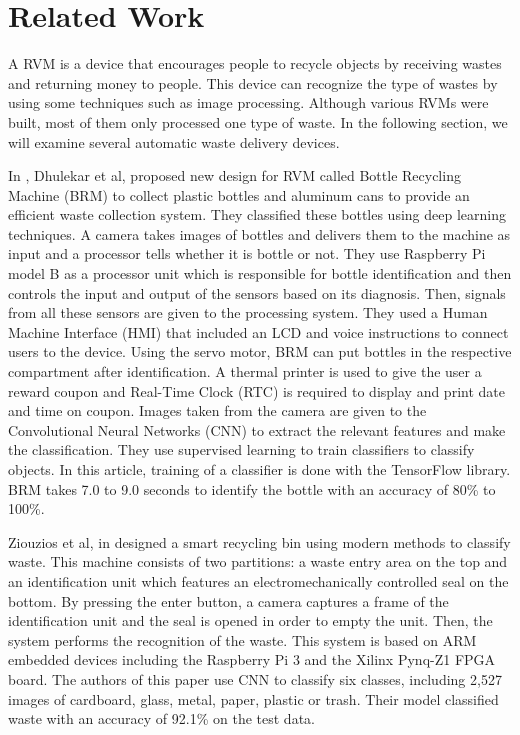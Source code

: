 \documentclass[conference]{IEEEtran}
\begin{document}
\section{Related Work}
A RVM is a device that encourages people to recycle objects by receiving wastes and returning money to people. This device can recognize the type of wastes by using some techniques such as image processing. Although various RVMs were built, most of them only processed one type of waste. In the following section, we will examine several automatic waste delivery devices.
\par
In \cite{dhulekar2018development}, Dhulekar et al, proposed new design for RVM called Bottle Recycling Machine (BRM) to collect plastic bottles and aluminum cans to provide an efficient waste collection system. They classified these bottles using deep learning techniques. A camera takes images of bottles and delivers them to the machine as input and a processor tells whether it is bottle or not. They use  Raspberry Pi model B as a processor unit which is responsible for bottle identification and then controls the input and output of the sensors based on its diagnosis. Then, signals from all these sensors are given to the processing system. They used a Human Machine Interface (HMI) that included an LCD and voice instructions to connect users to the device. Using the servo motor, BRM can put bottles in the respective compartment after identification. A thermal printer is used to give the user a reward coupon and Real-Time Clock (RTC) is required to display and print date and time on coupon. Images taken from the camera are given to the Convolutional Neural Networks (CNN) to extract the relevant features and make the classification. They use supervised learning to train classifiers to classify objects. In this article, training of a classifier is done with the TensorFlow library. BRM takes 7.0 to 9.0 seconds to identify the bottle with an accuracy of 80\% to 100\%.
\par
Ziouzios et al, in \cite{ziouzios2019smart} designed a smart recycling bin using modern methods to classify waste. This machine consists of two partitions: a waste entry area on the top and an identification unit which features an electromechanically controlled seal on the bottom. By pressing the enter button, a camera captures a frame of the identification unit and the seal is opened in order to empty the unit. Then, the system performs the recognition of the waste. This system is based on ARM embedded devices including the Raspberry Pi 3 and the Xilinx Pynq-Z1 FPGA board. The authors of this paper use CNN to classify six classes, including 2,527 images of cardboard, glass, metal, paper, plastic or trash. Their model classified waste with an accuracy of 92.1\% on the test data.\par
\end{document}
